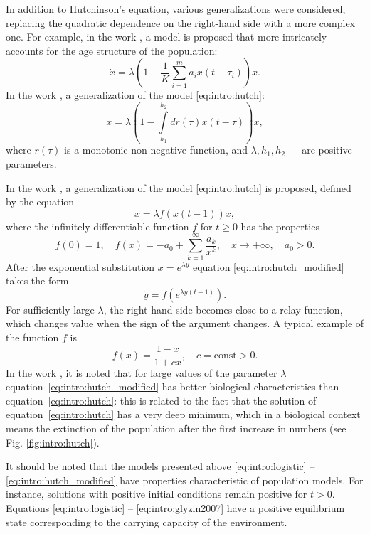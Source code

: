 In addition to Hutchinson's equation, various generalizations were considered, replacing the quadratic dependence on the right-hand side with a more complex one. For example, in the work \cite{Glyzin2007}, a model is proposed that more intricately accounts for the age structure of the population:
\begin{equation}
\label{eq:intro:glyzin2007}
	\dot{x}=\lambda \left(1 - \frac{1}{K}\sum\limits_{i = 1}^{m} a_i x(t-\tau_i)\right) x.
\end{equation}
%
In the work \cite{Kaschenko2012}, a generalization of the model \eqref{eq:intro:hutch}:
\begin{equation}
	\dot{x} = \lambda \left(1 - \int\limits_{h_1}^{h_2}dr(\tau)x(t - \tau)\right) x,
\end{equation}
where $r(\tau)$ is a monotonic non-negative function, and $\lambda, h_1, h_2$ --- are positive parameters.

In the work \cite{Kolesov2010}, a generalization of the model \eqref{eq:intro:hutch} is proposed, defined by the equation
\begin{equation}
\label{eq:intro:hutch_modified}
	\dot{x} = \lambda f(x(t - 1)) x,
\end{equation}
%
where the infinitely differentiable function $f$ for $t \geq 0$ has the properties
\[
f(0) = 1, \quad f(x) = -a_0 + \sum\limits_{k = 1}^{\infty} \frac{a_k}{x^k}, \quad x \to +\infty, \quad a_0 > 0.
\]
After the exponential substitution $x = e^{\lambda y}$ equation \eqref{eq:intro:hutch_modified} takes the form
\begin{equation}
\label{eq:intro:hutch_modified_exp}
\dot{y} = f(e^{\lambda y(t - 1)}).
\end{equation}
For sufficiently large $\lambda$, the right-hand side becomes close to a relay function, which changes value when the sign of the argument changes. A typical example of the function $f$ is
\[
f(x) = \dfrac{1 - x}{1 + cx}, \quad c = \text{const} > 0.
\]
In the work \cite{Kolesov2010}, it is noted that for large values of the parameter $\lambda$ equation~\eqref{eq:intro:hutch_modified} has better biological characteristics than equation~\eqref{eq:intro:hutch}: this is related to the fact that the solution of equation~\eqref{eq:intro:hutch} has a very deep minimum, which in a biological context means the extinction of the population after the first increase in numbers (see Fig. \ref{fig:intro:hutch}).

It should be noted that the models presented above \eqref{eq:intro:logistic} -- \eqref{eq:intro:hutch_modified} have properties characteristic of population models. For instance, solutions with positive initial conditions remain positive for $t > 0$. Equations \eqref{eq:intro:logistic} -- \eqref{eq:intro:glyzin2007} have a positive equilibrium state corresponding to the carrying capacity of the environment.

